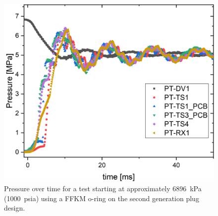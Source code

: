 \begin{figure}[htbp]
    \vspace{16pt}
    \centering
    \includegraphics[width=\textwidth]{results/plots/1000psi_Mpa_50.png}
    \caption{Pressure over time for a test starting at approximately \SI{6896}{\kilo\pascal} (\SI{1000}{psia}) using a FFKM o-ring on the second generation plug design.}
    \label{fig:piston 1000psi 50ms}
    \vspace{16pt}
\end{figure}


